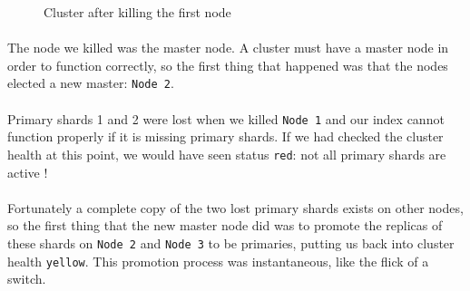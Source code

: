 \documentclass{article}%
\begin{document}
\begin{figure}[h!]
	\centering
	\caption{Cluster after killing the first node}
\end{figure}

\paragraph{} The node we killed was the master node. A cluster must have a master node in order to function correctly, so the first thing that happened was that the nodes elected a new master: \texttt{Node 2}.

\paragraph{} Primary shards 1 and 2 were lost when we killed \texttt{Node 1} and our index cannot function properly if it is missing primary shards. If we had checked the cluster health at this point, we would have seen status \texttt{red}: not all primary shards are active !

\paragraph{} Fortunately a complete copy of the two lost primary shards exists on other nodes, so the first thing that the new master node did was to promote the replicas of these shards on \texttt{Node 2} and \texttt{Node 3} to be primaries, putting us back into cluster health \texttt{yellow}. This promotion process was instantaneous, like the flick of a switch.
\end{document}

